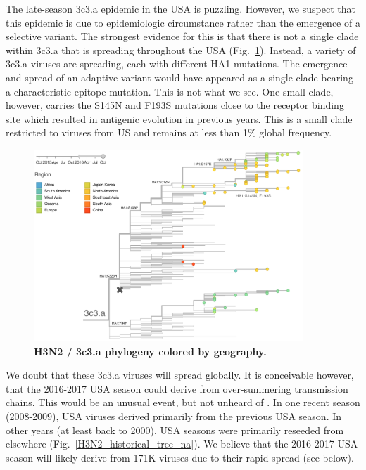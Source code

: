 \documentclass[11pt,oneside,letterpaper]{article}
\begin{document}
\pagebreak

The late-season 3c3.a epidemic in the USA is puzzling. However, we suspect that this epidemic is due to epidemiologic circumstance rather than the emergence of a selective variant. The strongest evidence for this is that there is not a single clade within 3c3.a that is spreading throughout the USA (Fig.\ \ref{H3N2_3c3a_tree}). Instead, a variety of 3c3.a viruses are spreading, each with different HA1 mutations. The emergence and spread of an adaptive variant would have appeared as a single clade bearing a characteristic epitope mutation. This is not what we see. One small clade, however, carries the S145N and F193S mutations close to the receptor binding site which resulted in antigenic evolution in previous years. This is a small clade restricted to viruses from US and remains at less than 1\% global frequency.

\begin{figure}[H]
	\centering
	\includegraphics[width=0.9\textwidth]{../figures/sep-2016/H3N2_3c3a_tree.png}
	\caption{\textbf{H3N2 / 3c3.a phylogeny colored by geography.}
	}
	\label{H3N2_3c3a_tree}
\end{figure}

\pagebreak

We doubt that these 3c3.a viruses will spread globally. It is conceivable however, that the 2016-2017 USA season could derive from over-summering transmission chains. This would be an unusual event, but not unheard of \cite{bedford2010global,bedford2015global}. In one recent season (2008-2009), USA viruses derived primarily from the previous USA season. In other years (at least back to 2000), USA seasons were primarily reseeded from elsewhere (Fig.\ \ref{H3N2_historical_tree_na}). We believe that the 2016-2017 USA season will likely derive from 171K viruses due to their rapid spread (see below).
\end{document}
